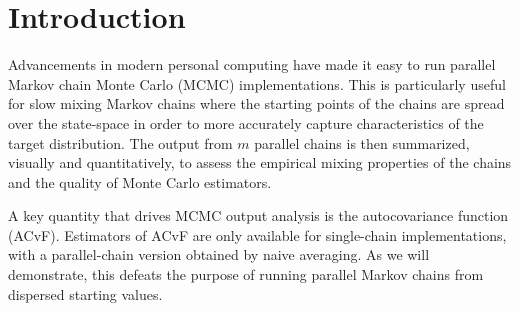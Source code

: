 \documentclass[12pt]{article}
\theoremstyle{remark}
\begin{document}
\section{Introduction} \label{sec:intro}

Advancements in modern personal computing have made it easy to run parallel Markov chain Monte Carlo (MCMC) implementations. This is particularly useful for slow mixing Markov chains where the starting points of the chains are spread over the state-space in order to more accurately capture characteristics of the target distribution. The output from $m$ parallel chains is then summarized, visually and quantitatively, to assess the empirical mixing properties of the chains and the quality of Monte Carlo estimators.

A key quantity that drives MCMC output analysis is the autocovariance function (ACvF).
 Estimators of ACvF are only available for single-chain implementations, with a parallel-chain version obtained by naive averaging. As we will demonstrate, this defeats the purpose of running parallel Markov chains from dispersed starting values.
 
\end{document}
